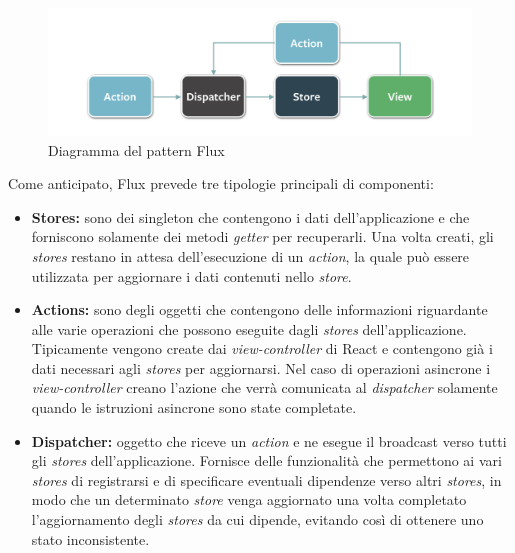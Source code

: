 
\begin{figure}[htp]
\centering
\includegraphics[width=\textwidth*3/4]{../immagini/flux-simple}
\caption{Diagramma del pattern Flux}  
\end{figure}
\FloatBarrier

Come anticipato, Flux prevede tre tipologie principali di componenti:
\begin{itemize}
\item \textbf{Stores:} sono dei \gls{singleton} che contengono i dati dell'applicazione e che forniscono solamente dei metodi \textit{getter} per recuperarli. Una volta creati, gli \textit{stores} restano in attesa dell'esecuzione di un \textit{action}, la quale può essere utilizzata per aggiornare i dati contenuti nello \textit{store}.
\item \textbf{Actions:} sono degli oggetti che contengono delle informazioni riguardante alle varie operazioni che possono eseguite dagli \textit{stores} dell'applicazione. Tipicamente vengono create dai \textit{view-controller} di React e contengono già i dati necessari agli \textit{stores} per aggiornarsi. Nel caso di operazioni asincrone i \textit{view-controller} creano l'azione che verrà comunicata al \textit{dispatcher} solamente quando le istruzioni asincrone sono state completate.
\item \textbf{Dispatcher:} oggetto che riceve un \textit{action} e ne esegue il broadcast verso tutti gli \textit{stores} dell'applicazione. Fornisce delle funzionalità che permettono ai vari \textit{stores} di registrarsi e di specificare eventuali dipendenze verso altri \textit{stores}, in modo che un determinato \textit{store} venga aggiornato una volta completato l'aggiornamento degli \textit{stores} da cui dipende, evitando così di ottenere uno stato inconsistente.


\end{itemize}


